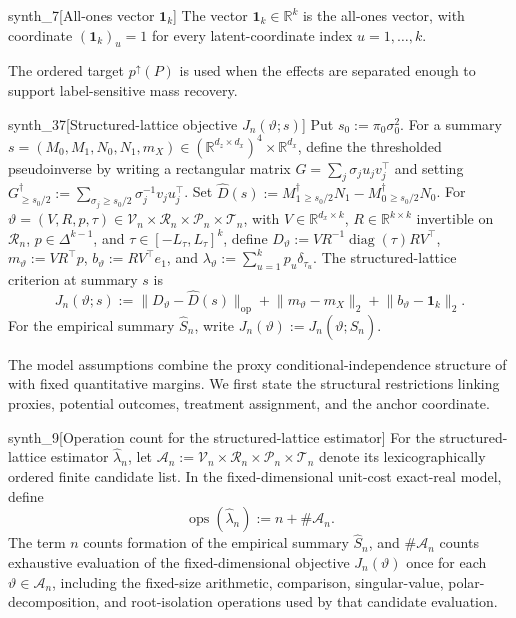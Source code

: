 \documentclass[11pt]{article}
\begin{document}
\begin{definitionv}{synth_7}[All-ones vector $\mathbf 1_k$]
The vector $\mathbf 1_k\in\mathbb R^k$ is the all-ones vector, with coordinate $(\mathbf 1_k)_u=1$ for every latent-coordinate index $u=1,\ldots,k$.
\end{definitionv}

The ordered target \(p^{\uparrow}(P)\) is used when the effects are separated enough to support label-sensitive mass recovery.

\begin{definitionv}{synth_37}[Structured-lattice objective $J_n(\vartheta;s)$]
Put $s_0:=\pi_0\sigma_0^2$. For a summary $s=(M_0,M_1,N_0,N_1,m_X)\in(\mathbb R^{d_z\times d_x})^4\times\mathbb R^{d_x}$, define the thresholded pseudoinverse by writing a rectangular matrix $G=\sum_j\sigma_j u_jv_j^\top$ and setting $G^\dagger_{\ge s_0/2}:=\sum_{\sigma_j\ge s_0/2}\sigma_j^{-1}v_ju_j^\top$. Set $\widehat D(s):=M_1^\dagger{}_{\ge s_0/2}N_1-M_0^\dagger{}_{\ge s_0/2}N_0$. For $\vartheta=(V,R,p,\tau)\in\mathcal V_n\times\mathcal R_n\times\mathcal P_n\times\mathcal T_n$, with $V\in\mathbb R^{d_x\times k}$, $R\in\mathbb R^{k\times k}$ invertible on $\mathcal R_n$, $p\in\Delta^{k-1}$, and $\tau\in[-L_\tau,L_\tau]^k$, define $D_\vartheta:=VR^{-1}\operatorname{diag}(\tau)RV^\top$, $m_\vartheta:=VR^\top p$, $b_\vartheta:=RV^\top e_1$, and $\lambda_\vartheta:=\sum_{u=1}^kp_u\delta_{\tau_u}$. The structured-lattice criterion at summary $s$ is 
\[
J_n(\vartheta;s):=\lVert D_\vartheta-\widehat D(s)\rVert_{\mathrm{op}}+\lVert m_\vartheta-m_X\rVert_2+\lVert b_\vartheta-\mathbf 1_k\rVert_2.
\]
For the empirical summary $\widehat S_n$, write $J_n(\vartheta):=J_n(\vartheta;\widehat S_n)$.
\end{definitionv}

The model assumptions combine the proxy conditional-independence structure of \citet{VirkMazaheriWu2026} with fixed quantitative margins. We first state the structural restrictions linking proxies, potential outcomes, treatment assignment, and the anchor coordinate.

\begin{definitionv}{synth_9}[Operation count for the structured-lattice estimator]
For the structured-lattice estimator \(\widehat\lambda_n\), let \(\mathcal A_n:=\mathcal V_n\times\mathcal R_n\times\mathcal P_n\times\mathcal T_n\) denote its lexicographically ordered finite candidate list. In the fixed-dimensional unit-cost exact-real model, define\[\operatorname{ops}(\widehat\lambda_n):=n+\#\mathcal A_n.\]The term \(n\) counts formation of the empirical summary \(\widehat S_n\), and \(\#\mathcal A_n\) counts exhaustive evaluation of the fixed-dimensional objective \(J_n(\vartheta)\) once for each \(\vartheta\in\mathcal A_n\), including the fixed-size arithmetic, comparison, singular-value, polar-decomposition, and root-isolation operations used by that candidate evaluation.
\end{definitionv}
\end{document}
